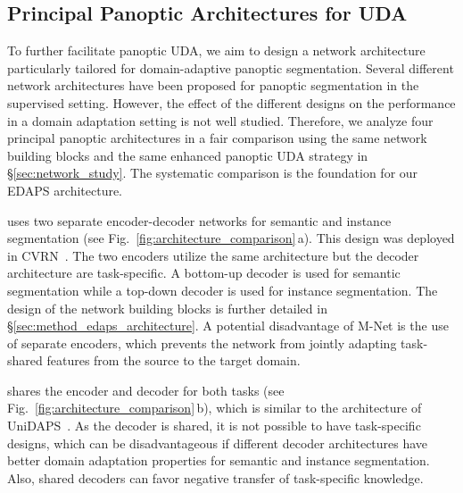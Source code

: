 \documentclass[10pt,twocolumn,letterpaper]{article}
\makeatletter
\renewcommand{\paragraph}{\@startsection{paragraph}{4}{\z@}{1.0ex \@plus 1ex \@minus .2ex}{-1em}{\normalfont\normalsize\bfseries}}
\makeatother
\begin{document}
\subsection{Principal Panoptic Architectures for UDA}
\label{sec:methods_principal_architectures}

To further facilitate panoptic UDA, we aim to design a network architecture particularly tailored for domain-adaptive panoptic segmentation.
Several different network architectures have been proposed for panoptic segmentation in the supervised setting. However, the effect of the different designs on the performance in a domain adaptation setting is not well studied. Therefore, we analyze four principal panoptic architectures in a fair comparison using the same network building blocks and the same enhanced panoptic UDA strategy in \S\ref{sec:network_study}. The systematic comparison is the foundation for our EDAPS architecture.

\paragraph{M-Net}

uses two separate encoder-decoder networks for semantic and instance segmentation (see Fig.~\ref{fig:architecture_comparison}\,a). This design was deployed in CVRN~\cite{huang2021cross}. The two encoders utilize the same architecture but the decoder architecture are task-specific. A bottom-up decoder is used for semantic segmentation while a top-down decoder is used for instance segmentation. The design of the network building blocks is further detailed in \S\ref{sec:method_edaps_architecture}. A potential disadvantage of M-Net is the use of separate encoders, which prevents the network from jointly adapting task-shared features from the source to the target domain.

\paragraph{S-Net}

shares the encoder and decoder for both tasks (see Fig.~\ref{fig:architecture_comparison}\,b), which is similar to the architecture of UniDAPS~\cite{zhang2022hierarchical}. As the decoder is shared, it is not possible to have task-specific designs, which can be disadvantageous if different decoder architectures have better domain adaptation properties for semantic and instance segmentation. Also, shared decoders can favor negative transfer of task-specific knowledge.
\end{document}
